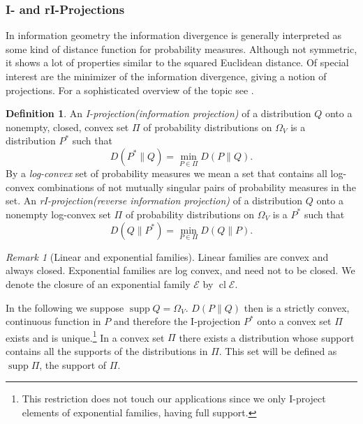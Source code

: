\documentclass[12pt]{amsart}
\DeclareMathOperator*{\supp}{supp}
\DeclareMathOperator*{\cl}{cl}
\theoremstyle{plain}%
\theoremstyle{definition}
\newtheorem{defn}[thm]{Definition}
\theoremstyle{remark}
\newtheorem*{rem}{Remark}
\begin{document}
\subsubsection{I- and rI-Projections}
In information geometry the information divergence is generally
interpreted as some kind of distance function for probability
measures. Although not symmetric, it shows a lot of properties similar
to the squared Euclidean distance. Of special interest are the
minimizer of the information divergence, giving a notion of
projections. For a sophisticated overview of the topic see
\cite{CsiMa03}. 
\begin{defn}
  \label{sec:i-ri-projections-definition}
  An \emph{I-projection(information projection)}
  of a distribution $Q$ onto a nonempty, closed, convex set $\Pi$ of
  probability distributions on $\Omega_V$ is a distribution $P^*$ such
  that
  \begin{equation*}
    \label{eq:definitionofrIprojection}
      D(P^*\parallel Q) = \min_{P\in\Pi}D(P\parallel Q).
  \end{equation*}
  By a \emph{log-convex} set of probability measures
  we mean a set that contains all log-convex combinations of not
  mutually singular pairs of probability measures in the set. An
  \emph{rI-projection(reverse information projection)}
   of a distribution $Q$ onto a nonempty
  log-convex set $\Pi$ of probability distributions on $\Omega_V$ is a
  $P^*$ such that
  \begin{equation*}
    \label{eq:definitionofIprojection}
      D(Q\parallel P^*) = \min_{P\in\Pi}D(Q\parallel P).
  \end{equation*}
\end{defn}

\begin{rem}[Linear and exponential families]
  Linear families are convex and always closed. Exponential families
  are log convex, and need not to be closed. We denote the closure of
  an exponential family $\mathcal{E}$ by $\cl\mathcal{E}$.
\end{rem}

In the following we suppose $\supp Q = \Omega_V$. $D(P\parallel Q)$
then is a strictly convex, continuous function in $P$ and therefore
the I-projection $P^*$ onto a convex set $\Pi$ exists and is
unique.\footnote{This restriction does not touch our applications
  since we only I-project elements of exponential families, having
  full support.}  In a convex set $\Pi$ there exists a distribution
whose support contains all the supports of the distributions in $\Pi$.
This set will be defined as $\supp \Pi$, the support of $\Pi$.
\end{document}
